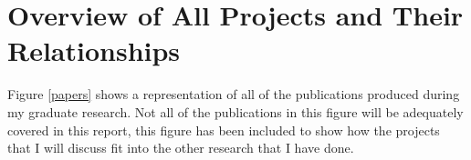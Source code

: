 

\section{Overview of All Projects and Their Relationships}

Figure \ref{papers} shows a representation of all of the publications produced during my graduate research. Not all of the publications in this figure will be adequately covered in this report, this figure has been included to show how the projects that I will discuss fit into the other research that I have done. 

